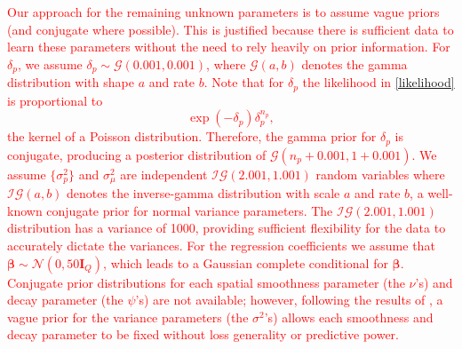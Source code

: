\documentclass[final]{statsoc}
\begin{document}
\textcolor{red}{Our approach for the remaining unknown parameters is to assume vague priors (and conjugate 
where possible). %
This is justified because there is sufficient data to learn these parameters without the need to rely heavily on prior information. For $\delta_p$, we assume $\delta_p \sim \mathcal{G}(0.001, 0.001)$, where $\mathcal{G}(a,b)$ denotes the gamma distribution with shape $a$ and rate $b$. Note that for $\delta_p$ the likelihood in \eqref{likelihood} is proportional to $$\exp\left(-\delta_p\right)\delta_p^{n_p},$$ the kernel of a Poisson distribution. Therefore, the gamma prior for $\delta_p$ is conjugate, producing a posterior distribution of $\mathcal{G}(n_p + 0.001, 1 + 0.001)$. We assume $\{\sigma^2_p\}$ and $\sigma^2_\mu$ are independent 
$\mathcal{IG}\left(2.001, 1.001\right)$ 
random variables where $\mathcal{IG}(a,b)$ denotes the inverse-gamma distribution with scale 
$a$ and rate $b$, a well-known conjugate prior for normal variance parameters. The $\mathcal{IG}(2.001, 1.001)$ distribution has a variance of 1000, providing sufficient flexibility for the data to accurately dictate the variances. For the regression coefficients we assume that $\boldsymbol{\beta} \sim 
\mathcal{N}(0, 50\mathbf{I}_{Q})$, which leads to a Gaussian complete conditional for $\boldsymbol{\beta}$. 
Conjugate prior distributions for each spatial smoothness parameter (the $\nu$'s) and decay 
parameter (the $\psi$'s) are not available; however, following the results of \cite{Zhang2004}, 
a vague prior for the variance parameters (the $\sigma^2$'s) allows each smoothness and decay 
parameter to be fixed without loss generality or predictive power.}
\end{document}
